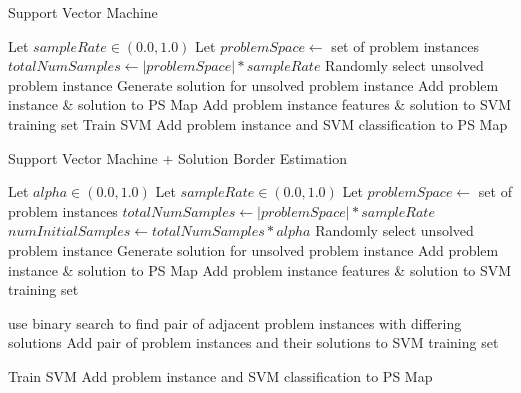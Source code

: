 \begin{algorithm}
\caption{Support Vector Machine}   
\label{alg:svm}
\small
\begin{algorithmic}[1] %
  
  \State Let $sampleRate \in (0.0,1.0)$
  \State Let $problemSpace \leftarrow$ set of problem instances
  \State $totalNumSamples \leftarrow |problemSpace| * sampleRate$
    \State Randomly select unsolved problem instance
    \State Generate solution for unsolved problem instance
    \State Add problem instance \& solution to PS Map
    \State Add problem instance features \& solution to SVM training set
  \EndFor
  \State Train SVM
    \State Add problem instance and SVM classification to PS Map
  \EndFor
\end{algorithmic}
\end{algorithm}

\begin{algorithm}
\caption{Support Vector Machine + Solution Border Estimation}   
\label{alg:svm+sbe}
\small
\begin{algorithmic}[1] %
  
  \State Let $alpha \in (0.0,1.0)$
  \State Let $sampleRate \in (0.0,1.0)$
  \State Let $problemSpace \leftarrow$ set of problem instances
  \State $totalNumSamples \leftarrow |problemSpace| * sampleRate$
  \State $numInitialSamples \leftarrow totalNumSamples * alpha$ 
    \State Randomly select unsolved problem instance
    \State Generate solution for unsolved problem instance
    \State Add problem instance \& solution to PS Map
    \State Add problem instance features \& solution to SVM training set
  \EndFor

   \label{alg:svmsbe:binarysearch}
    \State use binary search to find pair of adjacent problem instances with differing solutions
    \State Add pair of problem instances and their solutions to SVM training set
  \EndFor

  \State Train SVM
   \label{alg:svmsbe:makemap}
    \State Add problem instance and SVM classification to PS Map
  \EndFor
\end{algorithmic}
\end{algorithm}



